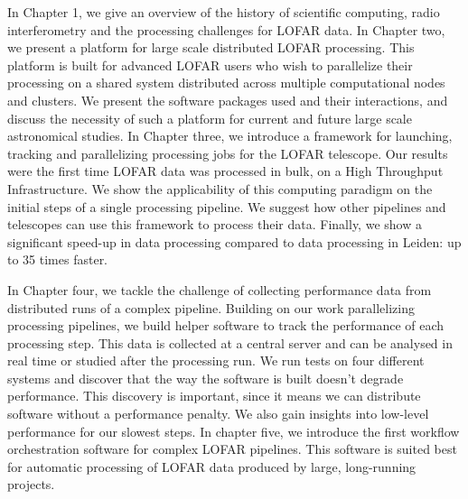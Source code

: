 In Chapter 1, we give an overview of the history of scientific computing, radio interferometry and the processing challenges for LOFAR data. In Chapter two, we present a platform for large scale distributed LOFAR processing. This platform is built for advanced LOFAR users who wish to parallelize their processing on a shared system distributed across multiple computational nodes and clusters. We present the software packages used and their interactions, and discuss the necessity of such a platform for current and future large scale astronomical studies. In Chapter three, we introduce a framework for launching, tracking and parallelizing processing jobs for the LOFAR telescope. Our results were the first time LOFAR data was processed in bulk, on a High Throughput Infrastructure. We show the applicability of this computing paradigm on the initial steps of a single processing pipeline. We suggest how other pipelines and telescopes can use this framework to process their data.  Finally, we show a significant speed-up in data processing compared to data processing in Leiden: up to 35 times faster. 

In Chapter four, we tackle the challenge of collecting performance data from distributed runs of a complex pipeline. Building on our work parallelizing processing pipelines, we build helper software to track the performance of each processing step. This data is collected at a central server and can be analysed in real time or studied after the processing run. We run tests on four different systems and discover that the way the software is built doesn't degrade performance. This discovery is important, since it means we can distribute software without a performance penalty. We also gain insights into low-level performance for our slowest steps.  In chapter five, we introduce the first workflow orchestration software for complex LOFAR pipelines. This software is suited best for automatic processing of LOFAR data produced by large, long-running projects. 


